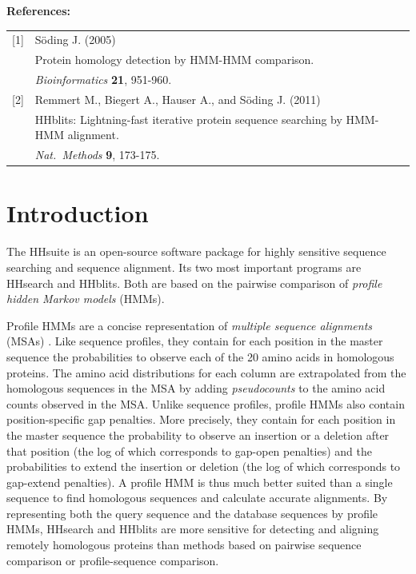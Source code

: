 \documentclass[11pt,a4paper]{article}
\begin{document}
{\bf References:}


\begin{tabular}[t]{ll}
[1] & S\"oding J. (2005)\\ 
    & Protein homology detection by HMM-HMM comparison.\\
    & {\it Bioinformatics} {\bf 21}, 951-960.\\[2mm]

[2] & Remmert M., Biegert A., Hauser A., and S\"oding J. (2011) \\
    & HHblits: Lightning-fast iterative protein sequence searching by HMM-HMM alignment. \\
    & {\it Nat.\  Methods} {\bf 9}, 173-175.\\
\end{tabular}



\newpage

\setlength{\parskip}{0mm}
\tableofcontents
\setlength{\parskip}{2mm}

\newpage

\section{Introduction}
The HHsuite is an open-source software package for highly sensitive sequence searching and sequence alignment. Its two most important programs are HHsearch and HHblits. Both are based on the pairwise comparison of \textit{profile hidden Markov models} (HMMs). 

Profile HMMs are a concise representation of \textit{multiple sequence alignments} (MSAs) \cite{Durbin:2008,Krogh:1994}. Like sequence profiles, they contain for each position in the master sequence the probabilities to observe each of the 20 amino acids in homologous proteins. The amino acid distributions for each column are extrapolated from the homologous sequences in the MSA by adding \textit{pseudocounts} to the amino acid counts observed in the MSA. Unlike sequence profiles, profile HMMs also contain position-specific gap penalties. More precisely, they contain for each position in the master sequence the probability to observe an insertion or a deletion after that position (the log of which corresponds to gap-open penalties) and the probabilities to extend the insertion or deletion (the log of which corresponds to gap-extend penalties). A profile HMM is thus much better suited than a single sequence to find homologous sequences and calculate accurate alignments. By representing both the query sequence and the database sequences by profile HMMs, HHsearch and HHblits are more sensitive for detecting and aligning remotely homologous proteins than methods based on pairwise sequence comparison or profile-sequence comparison.
\end{document}
